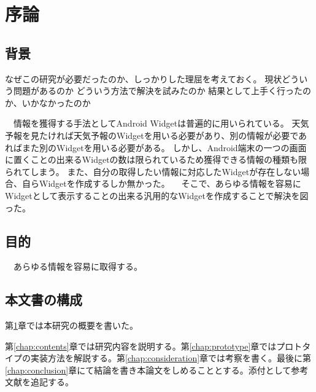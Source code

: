 \chapter{序論}
\label{chap:introduction}
\section{背景}
なぜこの研究が必要だったのか、しっかりした理屈を考えておく。
現状どういう問題があるのか
どういう方法で解決を試みたのか
結果として上手く行ったのか、いかなかったのか

　情報を獲得する手法としてAndroid Widgetは普遍的に用いられている。
天気予報を見たければ天気予報のWidgetを用いる必要があり、別の情報が必要であればまた別のWidgetを用いる必要がある。
しかし、Android端末の一つの画面に置くことの出来るWidgetの数は限られているため獲得できる情報の種類も限られてしまう。
また、自分の取得したい情報に対応したWidgetが存在しない場合、自らWidgetを作成するしか無かった。
　そこで、あらゆる情報を容易にWidgetとして表示することの出来る汎用的なWidgetを作成することで解決を図った。

\section{目的}
　あらゆる情報を容易に取得する。

\section{本文書の構成}
第\ref{chap:introduction}章では本研究の概要を書いた。

第\ref{chap:contents}章では研究内容を説明する。第\ref{chap:prototype}章ではプロトタイプの実装方法を解説する。第\ref{chap:consideration}章では考察を書く。最後に第\ref{chap:conclusion}章にて結論を書き本論文をしめることとする。添付として参考文献を追記する。
